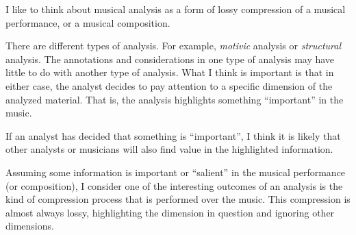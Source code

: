 

I like to think about musical analysis as a form of lossy
compression of a musical performance, or a musical
composition.

There are different types of analysis. For example,
\emph{motivic} analysis or \emph{structural} analysis. The
annotations and considerations in one type of analysis may
have little to do with another type of analysis. What I
think is important is that in either case, the analyst
decides to pay attention to a specific dimension of the
analyzed material. That is, the analysis highlights
something ``important'' in the music.


If an analyst has decided that something is ``important'', I
think it is likely that other analysts or musicians will
also find value in the highlighted information.


Assuming some information is important or ``salient'' in the
musical performance (or composition), I consider one of the
interesting outcomes of an analysis is the kind of
compression process that is performed over the music. This
compression is almost always lossy, highlighting the
dimension in question and ignoring other dimensions.
